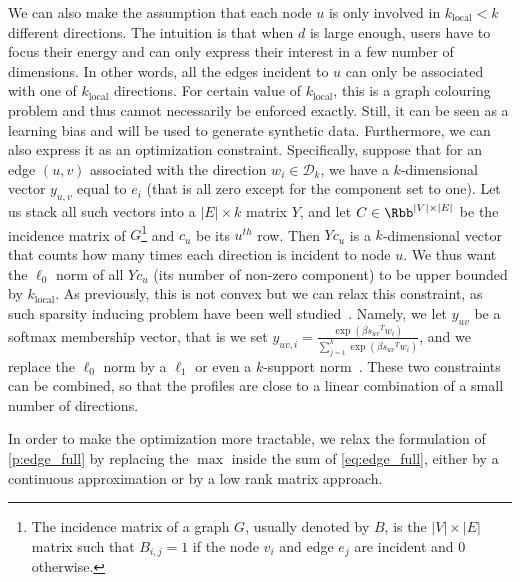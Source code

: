 We can also make the assumption that each node $u$ is only involved in $k_\mathrm{local} < k$
different directions. The intuition is that when $d$ is large enough, users have to focus their
energy and can only express their interest in a few number of dimensions. In other words, all the
edges incident to $u$ can only be associated with one of $k_\mathrm{local}$ directions. For
certain value of
$k_\mathrm{local}$, this is a \NPc{} graph colouring problem and thus cannot necessarily be enforced
exactly. Still, it can be seen as a learning bias and will be used to generate synthetic data.
Furthermore, we can also express it as an optimization constraint. Specifically, suppose that for
an edge $(u,v)$ associated with the direction $w_i \in \mathcal{D}_k$, we have a $k$-dimensional
vector $y_{u,v}$ equal to $e_i$ (that is all zero except for the \ith{} component set to one). Let
us stack all such vectors into a $|E| \times k$ matrix $Y$, and let $C \in \Rbb^{|V| \times |E|}$ be
the incidence matrix of $G$\footnote{The incidence matrix of a graph $G$, usually denoted by $B$, is
the $|V| \times |E|$ matrix such that $B_{i,j} = 1$ if the node $v_i$ and edge $e_j$ are incident
and 0 otherwise.} and $c_u$ be its $u^{th}$ row. Then $Yc_u$ is a $k$-dimensional vector that counts
how many times each direction is incident to node $u$. We thus want the $\ell_0$ norm of all $Yc_u$
(\ie its number of non-zero component) to be upper bounded by $k_\mathrm{local}$. As previously,
this is not convex but we can relax this constraint, as such sparsity inducing problem have been
well studied~\autocite{sparseOptim12}. Namely, we let $y_{uv}$ be a softmax membership vector, that
is we set $y_{uv,i} = \frac{\exp(\beta{s_{uv}}^T w_i)}{\sum_{j=1}^k \exp(\beta {s_{uv}}^T w_i)}$,
and we replace the $\ell_0$ norm by a $\ell_1$ or even a $k$-support norm~\autocite{KsupportNorm12}.
These two constraints can be combined, so that the profiles are close to a linear combination of a
small number of directions.


\bigskip

In order to make the optimization more tractable, we relax the formulation of \autoref{p:edge_full}
by replacing the $\max$ inside the sum of \eqref{eq:edge_full}, either by a continuous approximation
or by a low rank matrix approach.

